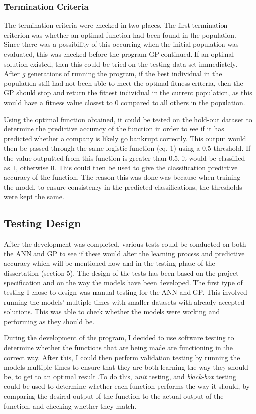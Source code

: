 \documentclass[11pt]{article}
\begin{document}
\subsubsection{Termination Criteria}\label{subsubsec:TC}
The termination criteria were checked in two places. The first termination criterion was whether an optimal function had been found in the population. Since there was a possibility of this occurring when the initial population was evaluated, this was checked before the program GP continued. If an optimal solution existed, then this could be tried on the testing data set immediately. After \textit{g} generations of running the program, if the best individual in the population still had not been able to meet the optimal fitness criteria, then the GP should stop and return the fittest individual in the current population, as this would have a fitness value closest to 0 compared to all others in the population. 

Using the optimal function obtained, it could be tested on the hold-out dataset to determine the predictive accuracy of the function in order to see if it has predicted whether a company is likely go bankrupt correctly. This output would then be passed through the same logistic function (eq. 1) using a 0.5 threshold. If the value outputted from this function is greater than 0.5, it would be classified as 1, otherwise 0. This could then be used to give the classification predictive accuracy of the function. The reason this was done was because when training the model, to ensure consistency in the predicted classifications, the thresholds were kept the same. 
\subsection{Testing Design}\label{subsec:TD}
After the development was completed, various tests could be conducted on both the ANN and GP to see if these would alter the learning process and predictive accuracy which will be mentioned now and in the testing phase of the dissertation (section 5). The design of the tests has been based on the project specification and on the way the models have been developed. 
The first type of testing I chose to design was manual testing for the ANN and GP. This involved running the models' multiple times with smaller datasets with already accepted solutions. This was able to check whether the models were working and performing as they should be. 

During the development of the program, I decided to use software testing to determine whether the functions that are being made are functioning in the correct way. After this, I could then perform validation testing by running the models multiple times to ensure that they are both learning the way they should be, to get to an optimal result .To do this, \textit{unit} testing, and \textit{black-box} testing could be used to determine whether each function performs the way it should, by comparing the desired output of the function to the actual output of the function, and checking whether they match.
\end{document}
